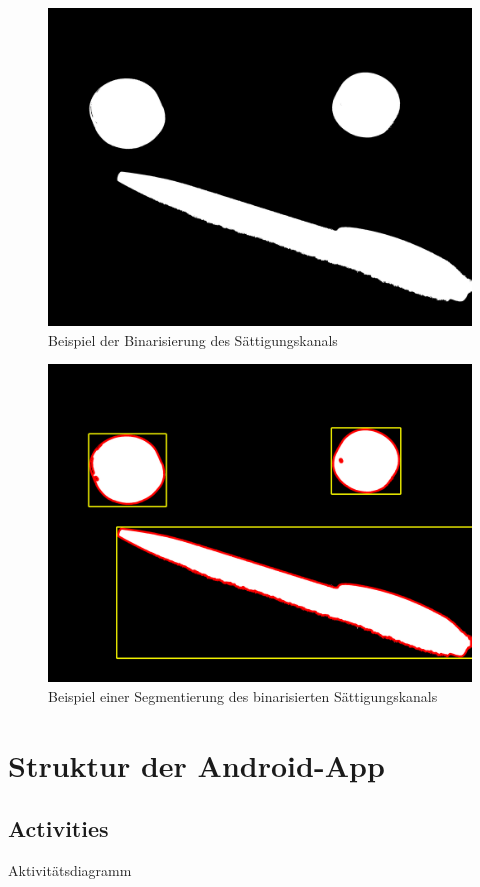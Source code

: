 \begin{figure}[h]
\centering
\includegraphics[width=\textwidth/2]{Bilder/Software/ColormodelsBinarized}
\caption{Beispiel der Binarisierung des Sättigungskanals}
\label{fig:BinarizedColorModels}
\end{figure}
\begin{figure}[h]
\centering
\includegraphics[width=\textwidth/2]{Bilder/Software/ColormodelsSegmentated}
\caption{Beispiel einer Segmentierung des binarisierten Sättigungskanals}
\label{fig:SegmentedColorModels}
\end{figure}


\section{Struktur der Android-App}
\subsection{Activities}
Aktivitätsdiagramm






